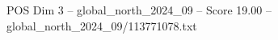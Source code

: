 \begin{textsample}{POS Dim 3 – global\_north\_2024\_09 – Score 19.00 – global\_north\_2024\_09/113771078.txt}
\end{textsample}
